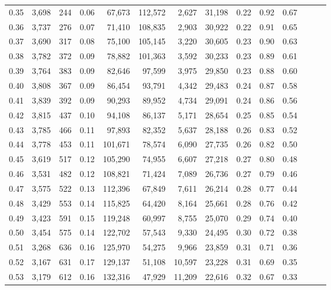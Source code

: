 \begin{tabular}{rrrrrrrrrrrrrr}
0.35 &  3,698 &  244 &  0.06 &   67,673 &  112,572 &   2,627 &  31,198 &  0.22 &  0.92 &      0.67 \\
0.36 &  3,737 &  276 &  0.07 &   71,410 &  108,835 &   2,903 &  30,922 &  0.22 &  0.91 &      0.65 \\
0.37 &  3,690 &  317 &  0.08 &   75,100 &  105,145 &   3,220 &  30,605 &  0.23 &  0.90 &      0.63 \\
0.38 &  3,782 &  372 &  0.09 &   78,882 &  101,363 &   3,592 &  30,233 &  0.23 &  0.89 &      0.61 \\
0.39 &  3,764 &  383 &  0.09 &   82,646 &   97,599 &   3,975 &  29,850 &  0.23 &  0.88 &      0.60 \\
0.40 &  3,808 &  367 &  0.09 &   86,454 &   93,791 &   4,342 &  29,483 &  0.24 &  0.87 &      0.58 \\
0.41 &  3,839 &  392 &  0.09 &   90,293 &   89,952 &   4,734 &  29,091 &  0.24 &  0.86 &      0.56 \\
0.42 &  3,815 &  437 &  0.10 &   94,108 &   86,137 &   5,171 &  28,654 &  0.25 &  0.85 &      0.54 \\
0.43 &  3,785 &  466 &  0.11 &   97,893 &   82,352 &   5,637 &  28,188 &  0.26 &  0.83 &      0.52 \\
0.44 &  3,778 &  453 &  0.11 &  101,671 &   78,574 &   6,090 &  27,735 &  0.26 &  0.82 &      0.50 \\
0.45 &  3,619 &  517 &  0.12 &  105,290 &   74,955 &   6,607 &  27,218 &  0.27 &  0.80 &      0.48 \\
0.46 &  3,531 &  482 &  0.12 &  108,821 &   71,424 &   7,089 &  26,736 &  0.27 &  0.79 &      0.46 \\
0.47 &  3,575 &  522 &  0.13 &  112,396 &   67,849 &   7,611 &  26,214 &  0.28 &  0.77 &      0.44 \\
0.48 &  3,429 &  553 &  0.14 &  115,825 &   64,420 &   8,164 &  25,661 &  0.28 &  0.76 &      0.42 \\
0.49 &  3,423 &  591 &  0.15 &  119,248 &   60,997 &   8,755 &  25,070 &  0.29 &  0.74 &      0.40 \\
0.50 &  3,454 &  575 &  0.14 &  122,702 &   57,543 &   9,330 &  24,495 &  0.30 &  0.72 &      0.38 \\
0.51 &  3,268 &  636 &  0.16 &  125,970 &   54,275 &   9,966 &  23,859 &  0.31 &  0.71 &      0.36 \\
0.52 &  3,167 &  631 &  0.17 &  129,137 &   51,108 &  10,597 &  23,228 &  0.31 &  0.69 &      0.35 \\
0.53 &  3,179 &  612 &  0.16 &  132,316 &   47,929 &  11,209 &  22,616 &  0.32 &  0.67 &      0.33 \\

\end{tabular}
